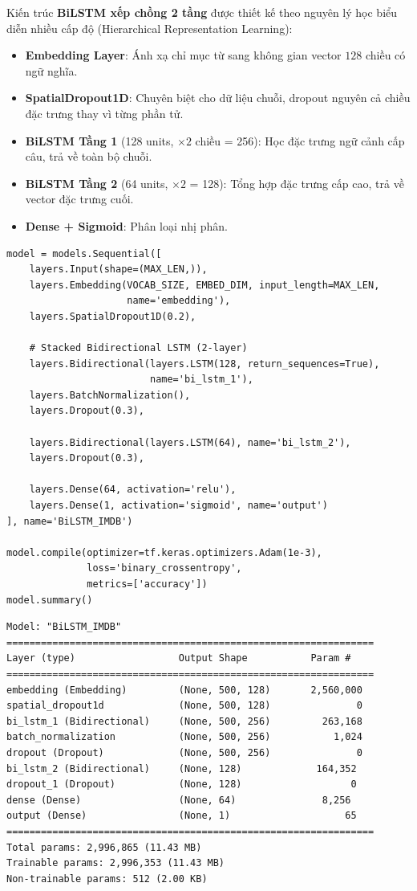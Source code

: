 Kiến trúc \textbf{BiLSTM xếp chồng 2 tầng} được thiết kế theo nguyên lý học biểu diễn nhiều cấp độ (Hierarchical Representation Learning):
\begin{itemize}
    \item \textbf{Embedding Layer}: Ánh xạ chỉ mục từ sang không gian vector $128$ chiều có ngữ nghĩa.
    \item \textbf{SpatialDropout1D}: Chuyên biệt cho dữ liệu chuỗi, dropout nguyên cả chiều đặc trưng thay vì từng phần tử.
    \item \textbf{BiLSTM Tầng 1} (128 units, $\times 2$ chiều = 256): Học đặc trưng ngữ cảnh cấp câu, trả về toàn bộ chuỗi.
    \item \textbf{BiLSTM Tầng 2} (64 units, $\times 2$ = 128): Tổng hợp đặc trưng cấp cao, trả về vector đặc trưng cuối.
    \item \textbf{Dense + Sigmoid}: Phân loại nhị phân.
\end{itemize}

\begin{lstlisting}[style=pythoncode, caption={Kiến trúc BiLSTM 2 tầng xếp chồng}]
model = models.Sequential([
    layers.Input(shape=(MAX_LEN,)),
    layers.Embedding(VOCAB_SIZE, EMBED_DIM, input_length=MAX_LEN,
                     name='embedding'),
    layers.SpatialDropout1D(0.2),

    # Stacked Bidirectional LSTM (2-layer)
    layers.Bidirectional(layers.LSTM(128, return_sequences=True),
                         name='bi_lstm_1'),
    layers.BatchNormalization(),
    layers.Dropout(0.3),

    layers.Bidirectional(layers.LSTM(64), name='bi_lstm_2'),
    layers.Dropout(0.3),

    layers.Dense(64, activation='relu'),
    layers.Dense(1, activation='sigmoid', name='output')
], name='BiLSTM_IMDB')

model.compile(optimizer=tf.keras.optimizers.Adam(1e-3),
              loss='binary_crossentropy',
              metrics=['accuracy'])
model.summary()
\end{lstlisting}

\begin{lstlisting}[style=consoleoutput, caption={Output: Cấu trúc mô hình BiLSTM IMDB}]
Model: "BiLSTM_IMDB"
================================================================
Layer (type)                  Output Shape           Param #
================================================================
embedding (Embedding)         (None, 500, 128)       2,560,000
spatial_dropout1d             (None, 500, 128)               0
bi_lstm_1 (Bidirectional)     (None, 500, 256)         263,168
batch_normalization           (None, 500, 256)           1,024
dropout (Dropout)             (None, 500, 256)               0
bi_lstm_2 (Bidirectional)     (None, 128)             164,352
dropout_1 (Dropout)           (None, 128)                   0
dense (Dense)                 (None, 64)               8,256
output (Dense)                (None, 1)                    65
================================================================
Total params: 2,996,865 (11.43 MB)
Trainable params: 2,996,353 (11.43 MB)
Non-trainable params: 512 (2.00 KB)
\end{lstlisting}

